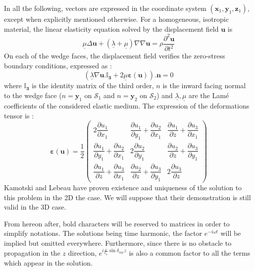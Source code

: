 In all the following, vectors are expressed in the coordinate system $(\mathbf{x}_1,\mathbf{y}_1, \mathbf{z}_1)$, except when explicitly mentioned otherwise. For a homogeneous, isotropic material, the linear elasticity equation solved by the displacement field $\mathbf{u}$ is 
\begin{equation}
\underline{\mu} \Delta \mathbf{u} + (\underline{\lambda}+\underline{\mu})\nabla \nabla \mathbf{u} = \rho \frac{\partial^2 \mathbf{u}}{\partial t^2}
\label{C4:Elasticitelin}
\end{equation}
On each of the wedge faces, the displacement field verifies the zero-stress boundary conditions, expressed as :
\begin{equation}
(\underline{\lambda} \nabla \mathbf{u} .\mathbf{\mathbb{I}_3}+2\underline{\mu} \mathbf{\varepsilon} (\mathbf{u})).\mathbf{n}=0
\label{C4:stressfree}
\end{equation}
where $\mathbf{\mathbb{I}_3}$ is the identity matrix of the third order, $n$ is the inward facing normal to the wedge face ($n=\mathbf{y}_1$ on $\mathcal{S}_1$  and $n=\mathbf{y}_2$ on $\mathcal{S}_2$) and $\underline{\lambda}, \underline{\mu}$ are the Lamé coefficients of the considered elastic medium. The expression of the deformations tensor is :
\begin{equation}
\mathbf{\varepsilon}(\mathbf{u})=\frac{1}{2} \begin{pmatrix}
2\dfrac{\partial u_1}{\partial x_1} & \dfrac{\partial u_1}{\partial y_1}+\dfrac{\partial u_2}{\partial x_1}&\dfrac{\partial u_1}{\partial z}+\dfrac{\partial u_3}{\partial x_1} \\
\dfrac{\partial u_1}{\partial y_1}+\dfrac{\partial u_2}{\partial x_1}&2\dfrac{\partial u_2}{\partial y_1}&\dfrac{\partial u_2}{\partial z}+\dfrac{\partial u_3}{\partial y_1} \\
\dfrac{\partial u_1}{\partial z}+\dfrac{\partial u_3}{\partial x_1} &\dfrac{\partial u_2}{\partial z}+\dfrac{\partial u_3}{\partial y_1} & 2\dfrac{\partial u_3}{\partial z}
\end{pmatrix}
\end{equation}
Kamotski and Lebeau \cite{KamotskiLebeau} have proven existence and uniqueness of the solution to this problem in the 2D the case. We will suppose that their demonstration is still valid in the 3D case.

From hereon after, bold characters will be reserved to matrices in order to simplify notations. The solutions being time harmonic, the factor $e^{-i\omega t}$ will be implied but omitted everywhere. Furthermore, since there is no obstacle to propagation in the $z$ direction, $e^{i\frac{\omega}{c_{\alpha}}\sin\delta_{inc}z}$ is also a common factor to all the terms which appear in the solution.

